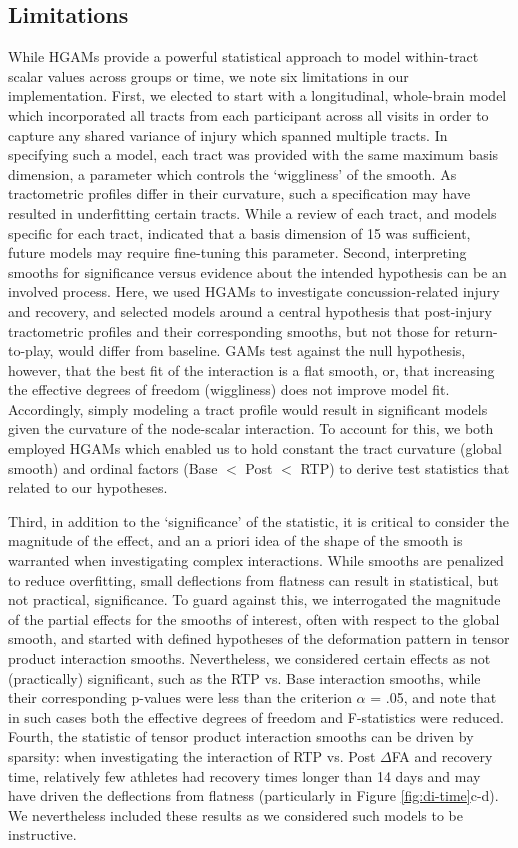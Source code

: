 \documentclass[12pt]{article}
\begin{document}
\subsection{Limitations}
\label{ssec:disc-limit}
While HGAMs provide a powerful statistical approach to model within-tract scalar values across groups or time, we note six limitations in our implementation. First, we elected to start with a longitudinal, whole-brain model which incorporated all tracts from each participant across all visits in order to capture any shared variance of injury which spanned multiple tracts. In specifying such a model, each tract was provided with the same maximum basis dimension, a parameter which controls the `wiggliness' of the smooth. As tractometric profiles differ in their curvature, such a specification may have resulted in underfitting certain tracts. While a review of each tract, and models specific for each tract, indicated that a basis dimension of 15 was sufficient, future models may require fine-tuning this parameter. Second, interpreting smooths for significance versus evidence about the intended hypothesis can be an involved process. Here, we used HGAMs to investigate concussion-related injury and recovery, and selected models around a central hypothesis that post-injury tractometric profiles and their corresponding smooths, but not those for return-to-play, would differ from baseline. GAMs test against the null hypothesis, however, that the best fit of the interaction is a flat smooth, or, that increasing the effective degrees of freedom (wiggliness) does not improve model fit. Accordingly, simply modeling a tract profile would result in significant models given the curvature of the node-scalar interaction. To account for this, we both employed HGAMs which enabled us to hold constant the tract curvature (global smooth) and ordinal factors (Base $<$ Post $<$ RTP) to derive test statistics that related to our hypotheses.

Third, in addition to the `significance' of the statistic, it is critical to consider the magnitude of the effect, and an a priori idea of the shape of the smooth is warranted when investigating complex interactions. While smooths are penalized to reduce overfitting, small deflections from flatness can result in statistical, but not practical, significance. To guard against this, we interrogated the magnitude of the partial effects for the smooths of interest, often with respect to the global smooth, and started with defined hypotheses of the deformation pattern in tensor product interaction smooths. Nevertheless, we considered certain effects as not (practically) significant, such as the RTP vs. Base interaction smooths, while their corresponding p-values were less than the criterion $\alpha$ = .05, and note that in such cases both the effective degrees of freedom and F-statistics were reduced. Fourth, the statistic of tensor product interaction smooths can be driven by sparsity: when investigating the interaction of RTP vs. Post $\Delta$FA and recovery time, relatively few athletes had recovery times longer than 14 days and may have driven the deflections from flatness (particularly in Figure \ref{fig:di-time}c-d). We nevertheless included these results as we considered such models to be instructive.
\end{document}

